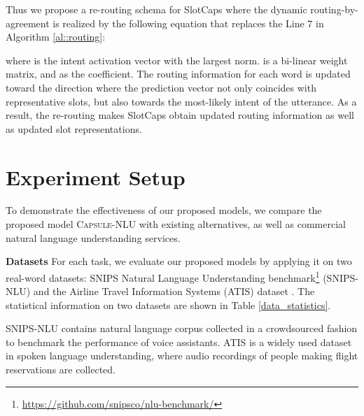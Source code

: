 \documentclass[11pt,a4paper,hyphens]{article}
\newcommand{\ModelName}{{\textsc{Capsule-NLU}}}
\newcommand{\SecondCapsule}{SlotCaps}
\begin{document}
Thus we propose a re-routing schema for {\SecondCapsule} where the dynamic routing-by-agreement is realized by the following equation that replaces the Line 7 in Algorithm \ref{al::routing}:

where  is the intent activation vector with the largest norm.
 is a bi-linear weight matrix, and  as the coefficient.
The routing information for each word is updated toward the direction where the prediction vector not only coincides with representative slots, but also towards the most-likely intent of the utterance.
As a result, the re-routing makes {\SecondCapsule} obtain updated routing information as well as updated slot representations. \section{Experiment Setup}
To demonstrate the effectiveness of our proposed models, we compare the proposed model {\ModelName} with existing alternatives, as well as commercial natural language understanding services.

\noindent\textbf{Datasets}
For each task, we evaluate our proposed models by applying it on two real-word datasets: SNIPS Natural Language Understanding benchmark\footnote{\url{https://github.com/snipsco/nlu-benchmark/}} (SNIPS-NLU) and the Airline Travel Information Systems (ATIS) dataset \cite{tur2010left}. The statistical information on two datasets are shown in Table \ref{data_statistics}.

\begin{table}[h!]
\centering
{}
\vspace{0.05in}
\caption{Dataset statistics.}
\label{data_statistics}
\end{table}

SNIPS-NLU contains natural language corpus collected in a crowdsourced fashion to benchmark the performance of voice assistants.
ATIS is a widely used dataset in spoken language understanding, where audio recordings of people making flight reservations are collected.
\end{document}
